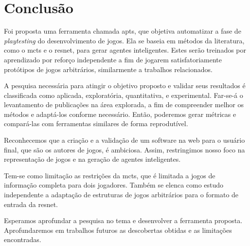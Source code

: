 \documentclass[12pt]{article}
\begin{document}
\section{Conclusão}%
\label{sec:conclusao}

Foi proposta uma ferramenta chamada \gls{apts}, que objetiva automatizar a fase de \textit{playtesting} do desenvolvimento de jogos.
Ela se baseia em métodos da literatura, como o \gls{mcts} e o \gls{resnet}, para gerar agentes inteligentes.
Estes serão treinados por aprendizado por reforço independente a fim de jogarem satisfatoriamente protótipos de jogos arbitrários, similarmente a trabalhos relacionados.

A pesquisa necessária para atingir o objetivo proposto e validar seus resultados é classificada como aplicada, exploratória, quantitativa, e experimental.
Far-se-á o levantamento de publicações na área explorada, a fim de compreender melhor os métodos e adaptá-los conforme necessário.
Então, poderemos gerar métricas e compará-las com ferramentas similares de forma reprodutível.

Reconhecemos que a criação e a validação de um software na web para o usuário final, que são os autores de jogos, é ambiciosa.
Assim, restringimos nosso foco na representação de jogos e na geração de agentes inteligentes.

Tem-se como limitação as restrições da \gls{mcts}, que é limitada a jogos de informação completa para dois jogadores.
Também se elenca como estudo independente a adaptação de estruturas de jogos arbitrários para o formato de entrada da \gls{resnet}.

Esperamos aprofundar a pesquisa no tema e desenvolver a ferramenta proposta.
Aprofundaremos em trabalhos futuros as descobertas obtidas e as limitações encontradas.

\printbibliography{}
\end{document}
